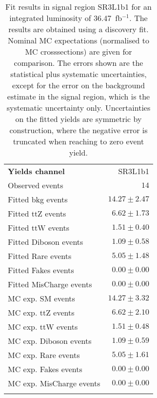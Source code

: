 

\begin{table}
\begin{center}
\setlength{\tabcolsep}{0.0pc}
{\small
\begin{tabular*}{\textwidth}{@{\extracolsep{\fill}}lr}
\noalign{\smallskip}\hline\noalign{\smallskip}
{\bfseries Yields channel}           & SR3L1b1              \\[-0.05cm]
\noalign{\smallskip}\hline\noalign{\smallskip}
Observed events          & $14$                    \\
\noalign{\smallskip}\hline\noalign{\smallskip}
Fitted bkg events         & $14.27 \pm 2.47$              \\
\noalign{\smallskip}\hline\noalign{\smallskip}
        Fitted ttZ events         & $6.62 \pm 1.73$              \\
        Fitted ttW events         & $1.51 \pm 0.40$              \\
        Fitted Diboson events         & $1.09 \pm 0.58$              \\
        Fitted Rare events         & $5.05 \pm 1.48$              \\
        Fitted Fakes events         & $0.00 \pm 0.00$              \\
        Fitted MisCharge events         & $0.00 \pm 0.00$              \\
 \noalign{\smallskip}\hline\noalign{\smallskip}
MC exp. SM events              & $14.27 \pm 3.32$              \\
\noalign{\smallskip}\hline\noalign{\smallskip}
        MC exp. ttZ events         & $6.62 \pm 2.10$              \\
        MC exp. ttW events         & $1.51 \pm 0.48$              \\
        MC exp. Diboson events         & $1.09 \pm 0.59$              \\
        MC exp. Rare events         & $5.05 \pm 1.61$              \\
        MC exp. Fakes events         & $0.00 \pm 0.00$              \\
        MC exp. MisCharge events         & $0.00 \pm 0.00$              \\
\noalign{\smallskip}\hline\noalign{\smallskip}
\end{tabular*}
}
\end{center}
\caption{Fit results in signal region SR3L1b1 for an integrated luminosity of 36.47~fb$^{-1}$.
The results are obtained using a discovery fit. Nominal MC expectations (normalised to MC crosssections) are given for comparison. 
The errors shown are the statistical plus systematic uncertainties, except for the error on the background estimate in the signal region, which is the systematic uncertainty only.
Uncertainties on the fitted yields are symmetric by construction, where the negative error is truncated when reaching to zero event yield.
}
\label{table.results.systematics.in.logL.fit..Yields.SR3L1b1}
\end{table}
\clearpage
%